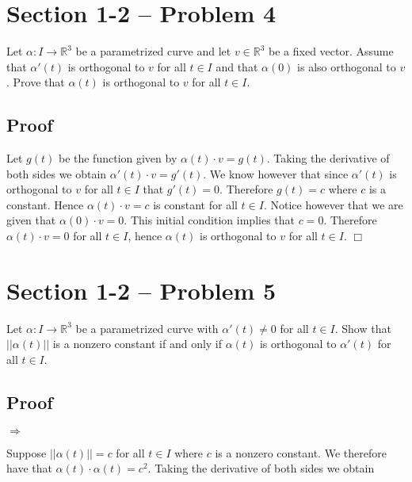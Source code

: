 \documentclass{article}
\begin{document}
\section*{Section 1-2 -- Problem 4}

\noindent Let $\alpha: I \to \mathbb{R}^3$ be a parametrized curve and let $v \in \mathbb{R}^3$ be a  fixed vector.  Assume that $\alpha'(t)$ is orthogonal to $v$ for all $t \in I$ and that $\alpha(0)$ is also orthogonal to $v$.  Prove that $\alpha(t)$ is orthogonal to $v$ for all $t \in I$.  

\subsection*{Proof}

\noindent Let $g(t)$ be the function given by $\alpha(t) \cdot v = g(t)$.  Taking the derivative of both sides we obtain $\alpha'(t) \cdot v = g'(t)$.  We know however that since $\alpha'(t)$ is orthogonal to $v$ for all $t \in I$ that $g'(t) = 0$.  Therefore $g(t) = c$ where $c$ is a constant.  Hence $\alpha(t) \cdot v = c$ is constant for all $t \in I$.  Notice however that we are given that $\alpha(0) \cdot v = 0$.  This initial condition implies that $c = 0$.  Therefore $\alpha(t) \cdot v = 0$ for all $t \in I$, hence $\alpha(t)$ is orthogonal to $v$ for all $t \in I$.  \hfill $\Box$


\section*{Section 1-2 -- Problem 5}

\noindent Let $\alpha: I \to \mathbb{R}^3$ be a parametrized curve with $\alpha'(t) \neq 0$ for all $t \in I$.  Show that $||\alpha(t)||$ is a nonzero constant if and only if $\alpha(t)$ is orthogonal to $\alpha'(t)$ for all $t \in I$.  

\subsection*{Proof}

\noindent $\Longrightarrow$

\noindent Suppose $||\alpha(t)|| = c$ for all $t \in I$ where $c$ is a nonzero constant.  We therefore have that $\alpha(t) \cdot \alpha(t) = c^2$.  Taking the derivative of both sides we obtain
\end{document}
